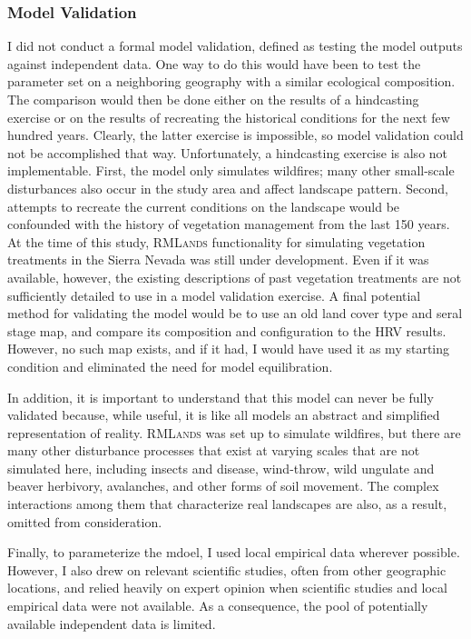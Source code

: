 \subsubsection{Model Validation} I did not conduct a formal model validation, defined as testing the model outputs against independent data. One way to do this would have been to test the parameter set on a neighboring geography with a similar ecological composition. The comparison would then be done either on the results of a hindcasting exercise or on the results of recreating the historical conditions for the next few hundred years. Clearly, the latter exercise is impossible, so model validation could not be accomplished that way. Unfortunately, a hindcasting exercise is also not implementable. First, the model only simulates wildfires; many other small-scale disturbances also occur in the study area and affect landscape pattern. Second, attempts to recreate the current conditions on the landscape would be confounded with the history of vegetation management from the last 150 years. At the time of this study, \textsc{RMLands} functionality for simulating vegetation treatments in the Sierra Nevada was still under development. Even if it was available, however, the existing descriptions of past vegetation treatments are not sufficiently detailed to use in a model validation exercise. A final potential method for validating the model would be to use an old land cover type and seral stage map, and compare its composition and configuration to the HRV results. However, no such map exists, and if it had, I would have used it as my starting condition and eliminated the need for model equilibration.

In addition, it is important to understand that this model can never be fully validated because, while useful, it is like all models an abstract and simplified representation of reality. \textsc{RMLands} was set up to simulate wildfires, but there are many other disturbance processes that exist at varying scales that are not simulated here, including insects and disease, wind-throw, wild ungulate and beaver herbivory, avalanches, and other forms of soil movement. The complex interactions among them that characterize real landscapes are also, as a result, omitted from consideration.

Finally, to parameterize the mdoel, I used local empirical data wherever possible. However, I also drew on relevant scientific studies, often from other geographic locations, and relied heavily on expert opinion when scientific studies and local empirical data were not available. As a consequence, the pool of potentially available independent data is limited. 

